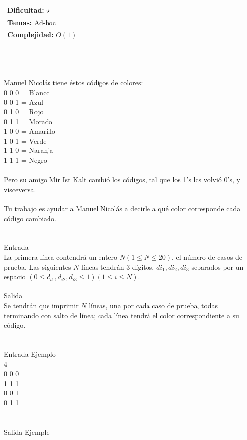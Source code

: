\documentclass[12pt]{article}
\begin{document}
\hfill
\begin{tabular}{@{}l@{}}
\textbf{Dificultad:} $\star$ \\
\textbf{Temas:} Ad-hoc \\
\textbf{Complejidad:} $O(1)$
\end{tabular}\\
\\
\\
Manuel Nicolás tiene éstos códigos de colores:\\
0 0 0 = Blanco\\
0 0 1 = Azul\\
0 1 0 = Rojo\\
0 1 1 = Morado\\
1 0 0 = Amarillo\\
1 0 1 = Verde\\
1 1 0 = Naranja\\
1 1 1 = Negro\\
\\Pero su amigo Mir Ist Kalt cambió los códigos, tal que los 1’s los volvió 0’s, y visceversa.\\
\\Tu trabajo es ayudar a Manuel Nicolás a decirle a qué color corresponde cada código cambiado.\\
\\
\\
\textrm{\large Entrada}
\\
La primera línea contendrá un entero $N (1 ≤ N ≤ 20)$, el número de casos de prueba. Las siguientes $N$ líneas tendrán $3$ dígitos, $di_1, di_2, di_3$ separados por un espacio $(0 ≤ d_{i1}, d_{i2}, d_{i3} ≤ 1)  (1 ≤ i ≤ N)$.
\\
\\
\textrm{\large Salida}
\\
Se tendrán que imprimir $N$ líneas, una por cada caso de prueba, todas terminando con salto de línea; cada línea tendrá el color correspondiente a su código.\\
\\
\\
\textrm{\large Entrada Ejemplo}
\\
4\\
0 0 0\\
1 1 1\\
0 0 1\\
0 1 1\\
\\
\\
\textrm{\large Salida Ejemplo}
\\
\end{document}
